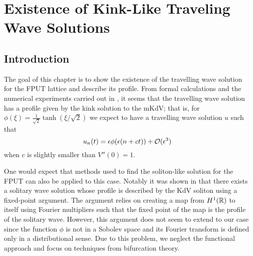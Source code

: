 \chapter{Existence of Kink-Like Traveling Wave Solutions}
\label{chp:existence}
\pagestyle{myheadings}

\section{Introduction}
The goal of this chapter is to show the existence of the travelling wave solution for the FPUT lattice and describe its profile. From formal calculations and the numerical experiments carried out in \cite{pace2019beta}, it seems that the travelling wave solution has a profile given by the kink solution to the mKdV; that is, for \(\phi(\xi) = \frac 1 {\sqrt 2} \tanh(\xi/\sqrt 2)\) we expect to have a travelling wave solution \(u\) such that 
\begin{equation}\label{formal-approximation}
	u_n(t) = \epsilon \phi(\epsilon(n + ct)) +\mathcal{O}(\epsilon^3)
\end{equation}
when \(c\) is slightly smaller than \(V''(0) = 1\).

One would expect that methods used to find the soliton-like solution for the FPUT can also be applied to this case. Notably it was shown in \cite{friesecke1999solitary} that there exists a solitary wave solution whose profile is described by the KdV soliton using a fixed-point argument. The argument relies on creating a map from \(H^1(\mathbb{R})\) to itself using Fourier multipliers such that the fixed point of the map is the profile of the solitary wave. However, this argument does not seem to extend to our case since the function \(\phi\) is not in a Sobolev space and its Fourier transform is defined only in a distributional sense. Due to this problem, we neglect the functional approach and focus on techniques from bifurcation theory. 


